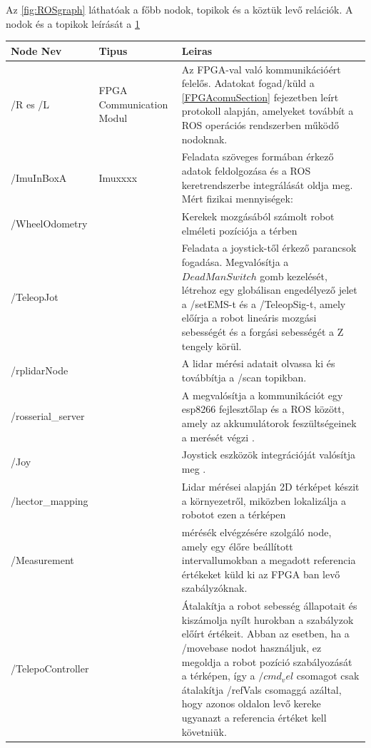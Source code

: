 Az \ref{fig:ROSgraph} láthatóak a főbb nodok, topikok és a köztük levő relációk. A nodok és a topikok leírását a \ref{Tab:nodok}

\begin{table}[H]
\centering
\begin{tabular}{lp{3cm}p{8cm}}
\hline Node Nev & Tipus & Leiras \\ \hline
  /R es /L      &  FPGA
  Communication
  Modul     &  Az FPGA-val való kommunikációért felelős. Adatokat fogad/küld  a \ref{FPGAcomuSection} fejezetben leírt protokoll alapján, amelyeket továbbít a ROS operációs rendszerben működő nodoknak.     \\
  /ImuInBoxA       &    Imuxxxx   &  Feladata szöveges formában érkező adatok feldolgozása és a ROS keretrendszerbe integrálását oldja meg. Mért fizikai mennyiségek:       \\
  /WheelOdometry       &       &   Kerekek mozgásából számolt robot elméleti pozíciója a térben     \\
  /TeleopJot      &       & Feladata a joystick-től érkező parancsok fogadása. Megvalósítja a $Dead Man Switch$ gomb kezelését, létrehoz egy globálisan engedélyező jelet a /setEMS-t és a /TeleopSig-t, amely előírja a robot lineáris mozgási sebességét és a forgási sebességét a Z tengely körül.  \\
  /rplidarNode & & A lidar mérési adatait olvassa ki és továbbítja a /scan topikban.\\
  /rosserial\_server & & A megvalósítja a kommunikációt egy esp8266 fejlesztőlap és a ROS között, amely az akkumulátorok feszültségeinek a merését végzi \cite{RosSerial}.\\
  /Joy & & Joystick eszközök integrációját valósítja meg \cite{rosjoy}.\\
  /hector\_mapping & & Lidar mérései alapján 2D térképet készit a környezetről, miközben lokalizálja a robotot ezen a térképen \cite{roshectormap}\\
  /Measurement & & mérésék elvégzésére szolgáló node, amely egy élőre beállított intervallumokban a megadott referencia értékeket küld ki az FPGA ban levő szabályzóknak.\\
  /TelepoController & & Átalakítja a robot sebesség állapotait és kiszámolja nyílt hurokban a szabályzok előírt értékeit. Abban az esetben, ha a /movebase nodot használjuk, ez megoldja a robot pozíció szabályozását a térképen, így a $/cmd_vel$ csomagot csak átalakítja /refVals csomaggá azáltal, hogy azonos oldalon levő kereke ugyanazt a referencia értéket kell követniük.
  
\end{tabular}
 \label{Tab:nodok} 
\end{table}

